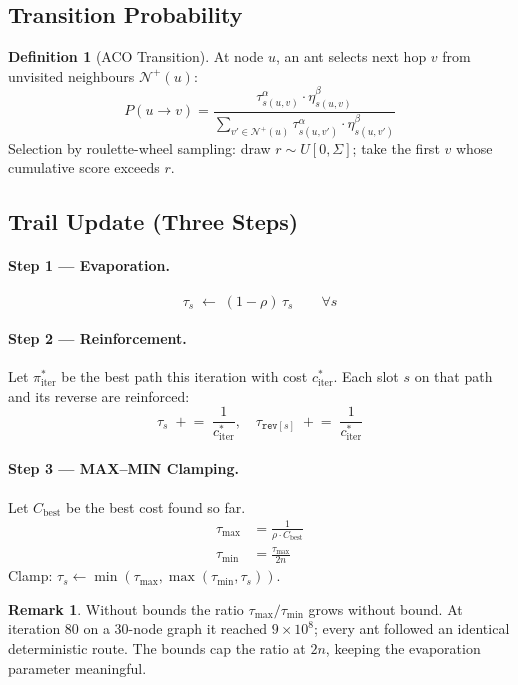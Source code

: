 \documentclass[11pt,a4paper]{article}
\theoremstyle{definition}
\newtheorem{definition}{Definition}[section]
\newtheorem{remark}{Remark}[section]
\begin{document}
\subsection{Transition Probability}

\begin{definition}[ACO Transition]
  At node $u$, an ant selects next hop $v$ from unvisited neighbours
  $\mathcal{N}^+(u)$:
  \[
    P(u\to v) =
    \frac{\tau_{s(u,v)}^{\alpha}\cdot\eta_{s(u,v)}^{\beta}}
         {\displaystyle\sum_{v'\in\mathcal{N}^+(u)}
          \tau_{s(u,v')}^{\alpha}\cdot\eta_{s(u,v')}^{\beta}}
  \]
  Selection by roulette-wheel sampling: draw $r\sim U[0,\Sigma]$; take the first $v$
  whose cumulative score exceeds $r$.
\end{definition}

\subsection{Trail Update (Three Steps)}

\paragraph{Step 1 — Evaporation.}
\[
  \tau_s \;\leftarrow\; (1-\rho)\,\tau_s \qquad\forall s
\]

\paragraph{Step 2 — Reinforcement.}
Let $\pi^*_{\text{iter}}$ be the best path this iteration with cost $c^*_{\text{iter}}$.
Each slot $s$ on that path and its reverse are reinforced:
\[
  \tau_s \;\mathrel{+}=\; \frac{1}{c^*_{\text{iter}}},\quad
  \tau_{\texttt{rev}[s]} \;\mathrel{+}=\; \frac{1}{c^*_{\text{iter}}}
\]

\paragraph{Step 3 — MAX--MIN Clamping.}
Let $C_{\text{best}}$ be the best cost found so far.
\begin{align}
  \tau_{\max} &= \frac{1}{\rho\cdot C_{\text{best}}} \\
  \tau_{\min} &= \frac{\tau_{\max}}{2n}
\end{align}
Clamp: $\tau_s\leftarrow\min(\tau_{\max},\max(\tau_{\min},\tau_s))$.

\begin{remark}
  Without bounds the ratio $\tau_{\max}/\tau_{\min}$ grows without bound.  At iteration 80
  on a 30-node graph it reached $9\times10^8$; every ant followed an identical deterministic
  route.  The bounds cap the ratio at $2n$, keeping the evaporation parameter meaningful.
\end{remark}
\end{document}
